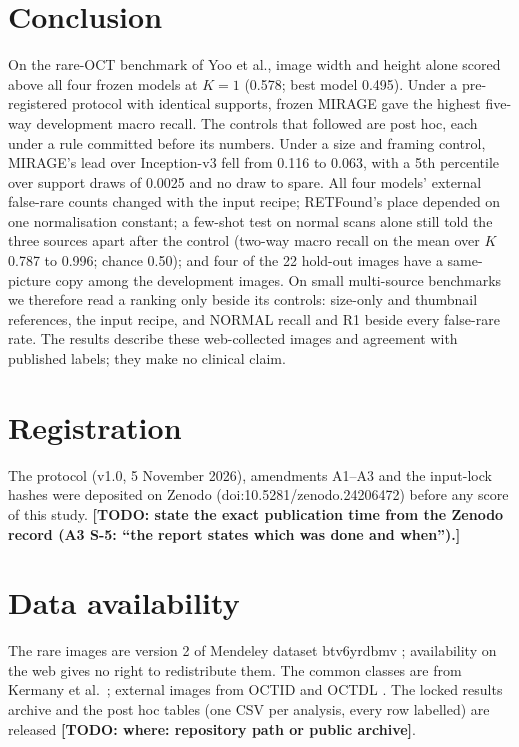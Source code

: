 \documentclass[conference]{IEEEtran}
\newcommand{\todo}[1]{\textbf{[TODO: #1]}}
\begin{document}
\section{Conclusion}
On the rare-OCT benchmark of Yoo et al., image width and height alone scored above all four frozen models at $K=1$ (0.578; best model 0.495). Under a pre-registered protocol with identical supports, frozen MIRAGE gave the highest five-way development macro recall. The controls that followed are post hoc, each under a rule committed before its numbers. Under a size and framing control, MIRAGE's lead over Inception-v3 fell from 0.116 to 0.063, with a 5th percentile over support draws of 0.0025 and no draw to spare. All four models' external false-rare counts changed with the input recipe; RETFound's place depended on one normalisation constant; a few-shot test on normal scans alone still told the three sources apart after the control (two-way macro recall on the mean over $K$ 0.787 to 0.996; chance 0.50); and four of the 22 hold-out images have a same-picture copy among the development images. On small multi-source benchmarks we therefore read a ranking only beside its controls: size-only and thumbnail references, the input recipe, and NORMAL recall and R1 beside every false-rare rate. The results describe these web-collected images and agreement with published labels; they make no clinical claim.

\section*{Registration}
The protocol (v1.0, 5 November 2026), amendments A1--A3 and the input-lock hashes were deposited on Zenodo (doi:10.5281/zenodo.24206472) before any score of this study. \todo{state the exact publication time from the Zenodo record (A3 S-5: ``the report states which was done and when'').}

\section*{Data availability}
The rare images are version 2 of Mendeley dataset btv6yrdbmv \cite{Yoo2021}; availability on the web gives no right to redistribute them. The common classes are from Kermany et al.\ \cite{Kermany2018}; external images from OCTID \cite{OCTID2020} and OCTDL \cite{OCTDL2024}. The locked results archive and the post hoc tables (one CSV per analysis, every row labelled) are released \todo{where: repository path or public archive}.
\end{document}
